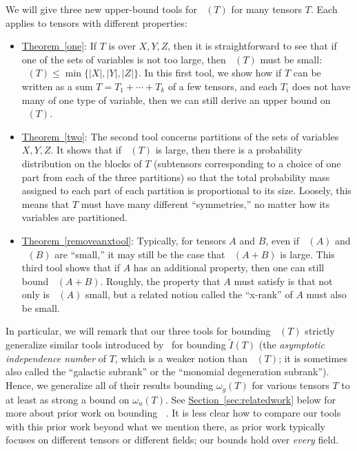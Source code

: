 \documentclass[11pt]{article}
\numberwithin{equation}{section}
\theoremstyle{definition}
\theoremstyle{plain}
\newcommand{\expref}[2]{\hyperref[#2]{#1~\ref{#2}}}
\newcommand{\tsr}{\mathop{\tilde{\operatorname{S}}}}
\theoremstyle{definition}
\begin{document}
We will give three new 
%
upper-bound tools for  %
$\tsr(T)$ for many tensors $T$. Each applies to tensors with different properties:

\begin{itemize}
    \item \expref{Theorem}{one}: If $T$ is over $X,Y,Z$, then it is straightforward to see that if one of the 
    sets of variables
    is not too large, then $\tsr(T)$ must be small: $\tsr(T) \leq \min\{ |X|, |Y|, |Z| \}$. In this first tool, we show how if $T$ can be written as a sum $T = T_1 + \cdots + T_k$ of a few tensors, and each $T_i$ does not have many of one type of variable, then we can still derive an upper bound on $\tsr(T)$. 
    \item \expref{Theorem}{two}: The second tool concerns partitions of the  
    sets of variables
    $X,Y,Z$. It shows that if $\tsr(T)$ is large, then there is a probability distribution on the blocks of $T$ (subtensors corresponding to a choice of one part from each of the three partitions) so that the total probability mass assigned to each part of each partition is proportional to its size. Loosely, this means that $T$ must have many different ``symmetries,'' no matter how its variables are partitioned. 
    \item \expref{Theorem}{removeanxtool}: Typically, for tensors $A$ and $B$, even if $\tsr(A)$ and $\tsr(B)$ are ``small,'' it may still be the case that $\tsr(A+B)$ is large. This third tool shows that if $A$ has an additional property, then one can still bound $\tsr(A+B)$. Roughly, the property that $A$ must satisfy is that not only is $\tsr(A)$ small, but a related notion called the ``x-rank'' of $A$ must also be small.
\end{itemize}

In particular, we will remark that our three tools for bounding $\tsr(T)$ strictly generalize similar tools introduced by~\cite{aw} for bounding $\tilde{I}(T)$ (the \emph{asymptotic independence number} of $T$, which is a weaker notion than $\tsr(T)$; it is sometimes also called the ``galactic subrank'' or the ``monomial degeneration subrank''). Hence, we generalize all of their results bounding $\omega_g(T)$ for various tensors $T$ to at least as strong a bound on $\omega_u(T)$. See \expref{Section}{sec:relatedwork} below for more about prior work on bounding $\tsr$. It is less clear how to compare our tools with this prior work beyond what we mention there, as prior work typically focuses on different tensors or different fields; our bounds hold over \emph{every} field.
\end{document}
